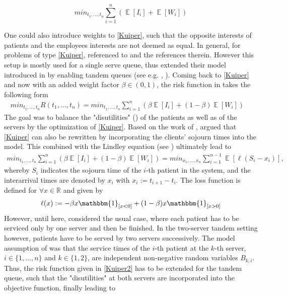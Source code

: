 \documentclass[11pt,a4paper]{article}
\DeclareMathOperator{\EX}{\mathbb{E}}%
\begin{document}
\begin{spacing}{1.8}
\begin{equation} \label{Kuiper} min_{t_1,\dots,t_n} \sum_{i=1}^{n} \left( \EX \left[I_i\right] + \EX \left[W_i\right] \right) \end{equation}



One could also introduce weights to \eqref{Kuiper}, such that the opposite interests of patients and the employees interests are not deemed as equal. In general, for problems of type \eqref{Kuiper}, \citet{Kuiper2015} referenced to \citep{CAYIRLI2009} and the references therein. However this setup is mostly used for a single serve queue, thus \citet{Kuiper2015} extended their model introduced in \citep{Kuiper2014} by enabling tandem queues (see e.g. \citep{Boxma1979}, \citep{BPinedo1982}). Coming back to \eqref{Kuiper} and now with an added weight factor \(\beta \in \left(0,1\right)\), the risk function in \citep{Kuiper2015} takes the following form
\begin{align} \label{Kuiper2} min_{t_1,\dots,t_n} R(t_1, \dots, t_n) = min_{t_1,\dots,t_n} \sum_{i=1}^{n} \left(\beta \EX \left[I_i\right] + (1-\beta) \EX \left[W_i\right] \right) \quad   \end{align}
The goal was to balance  the "disutilities" (\citep{Kuiper2014}) of the patients as well as of the servers by the optimization of \eqref{Kuiper}. Based on the work of \citep{Kemper2014},  \citet{Kuiper2015} argued that \eqref{Kuiper} can also be rewritten by incorporating the clients' sojourn times into the model. This combined with the Lindley equation (see \citep{Lindley1952}) ultimately lead to
\begin{align} \label{Kuiper2}
min_{t_1,\dots,t_n} \sum_{i=1}^{n} \left(\beta \EX \left[I_i\right] + (1-\beta) \EX \left[W_i\right] \right) = min_{x_1,\dots,x_n} \sum_{i=1}^{n-1} \EX \left[ \ell (S_i-x_i)
\right], \end{align}
whereby \(S_i\) indicates the sojourn time of the \(i\)-th patient in the system, and the interarrival times are denoted by \(x_i\) with \(x_i := t_{i+1}-t_i\). The loss function is defined for \(\forall x \in \mathbb{R}\) and given by
\begin{align} \ell(x):= -\beta x \mathbbm{1}_{\left[x < 0 \right]} + (1-\beta) x \mathbbm{1}_{\left[x > 0\right]} \end{align}
However, until here, \citet{Kuiper2015} considered the usual case, where each patient has to be serviced only by one server and then be finished. In the two-server tandem setting however,  patients have to be  served by two servers successively. The model assumption of \citet{Kuiper2015} was that  the service times 
of the \(i\)-th patient at the \(k\)-th server, \(i \in \{1,\dots,n \}\) and \(k \in \{1,2\}\), are independent non-negative random variables \(B_{k,i}\). Thus, the risk function given in \eqref{Kuiper2} has to be extended for the tandem queue, such that the "disutilities" at both servers are incorporated into the objective function, finally leading to


\end{spacing}
\end{document}
